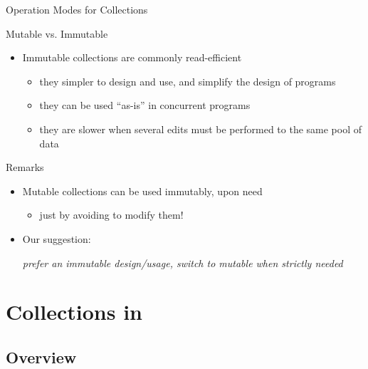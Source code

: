 \documentclass[presentation]{beamer}
\begin{document}
\begin{frame}[allowframebreaks]{Operation Modes for Collections}
\begin{alertblock}{Mutable vs. Immutable}
\begin{itemize}
      \item Immutable collections are commonly \alert{read-efficient}
      \begin{itemize}
        \item they simpler to design and use, and simplify the design of programs
        \item they can be used ``as-is'' in \alert{concurrent} programs
        \item they are slower when several edits must be performed to the same pool of data
      \end{itemize}
    \end{itemize}
  \end{alertblock}

  \begin{exampleblock}{Remarks}
    \begin{itemize}
      \item Mutable collections can be used \alert{immutably}, upon need
      \begin{itemize}
        \item just by avoiding to modify them!
      \end{itemize}

      \item Our suggestion:
      \begin{center}\itshape\small
        prefer an immutable design/usage, switch to mutable when strictly needed
      \end{center}
    \end{itemize}
  \end{exampleblock}
\end{frame}

\section{Collections in \dotnet}

\subsection{Overview}
\end{document}
